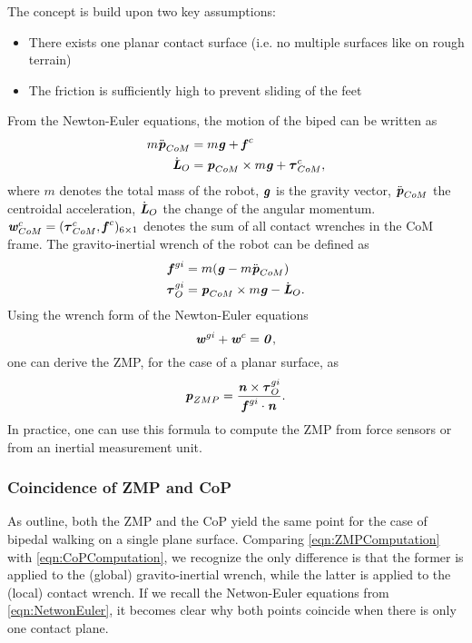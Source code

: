 The concept is build upon two key assumptions:
\begin{itemize}
\item There exists one planar contact surface (i.e. no multiple surfaces like on rough terrain)
\item The friction is sufficiently high to prevent sliding of the feet
\end{itemize}
From the Newton-Euler equations, the motion of the biped can be written as
\begin{align*}
m\ddot{\bm{\mathit{p}}}_{CoM} &= m\bm{\mathit{g}}+\bm{\mathit{f}}^c \\
\dot{\bm{\mathit{L}}}_O &= \bm{\mathit{p}}_{CoM}\times m\bm{\mathit{g}}+\bm{\mathit{\tau}}_{CoM}^c,
\end{align*}
where $m$ denotes the total mass of the robot, $\bm{\mathit{g}}$ is the gravity vector, $\ddot{\bm{\mathit{p}}}_{CoM}$ the centroidal acceleration, $\dot{\bm{\mathit{L}}}_O$ the change of the angular momentum. $\bm{\mathit{w}}_{CoM}^c=(\bm{\mathit{\tau}}_{CoM}^c, \bm{\mathit{f}}^c)_{6\times 1}$ denotes the sum of all contact wrenches in the \gls{CoM} frame. The gravito-inertial wrench of the robot can be defined as
\begin{align*}
\bm{\mathit{f}}^{gi} &= m(\bm{\mathit{g}}-m\ddot{\bm{\mathit{p}}}_{CoM}) \\
\bm{\mathit{\tau}}_O^{gi} &= \bm{\mathit{p}}_{CoM}\times m\bm{\mathit{g}}-\dot{\bm{\mathit{L}}}_O.
\end{align*}
Using the wrench form of the Newton-Euler equations
\begin{equation}\label{eqn:NetwonEuler} 
\bm{\mathit{w}}^{gi}+\bm{\mathit{w}}^c=\bm{\mathit{0}},
\end{equation}
one can derive the \gls{ZMP}, for the case of a planar surface, as
\begin{equation}\label{eqn:ZMPComputation}
\bm{\mathit{p}}_{ZMP}=\dfrac{\bm{\mathit{n}}\times\bm{\mathit{\bm{\mathit{\tau}}}}_O^{gi}}{\bm{\mathit{f}}^{gi}\cdot\bm{\mathit{n}}}.
\end{equation}
In practice, one can use this formula to compute the \gls{ZMP} from force sensors or from an inertial measurement unit. 
\subsubsection{Coincidence of ZMP and CoP}
As \citeauthor{sardain2004forces} outline, both the \gls{ZMP} and the \gls{CoP} yield the same point for the case of bipedal walking on a single plane surface. 
Comparing \cref{eqn:ZMPComputation} with \cref{eqn:CoPComputation}, we recognize the only difference is that the former is applied to the (global) gravito-inertial wrench, while the latter is applied to the (local) contact wrench. If we recall the Netwon-Euler equations from \cref{eqn:NetwonEuler}, it becomes clear why both points coincide when there is only one contact plane.


